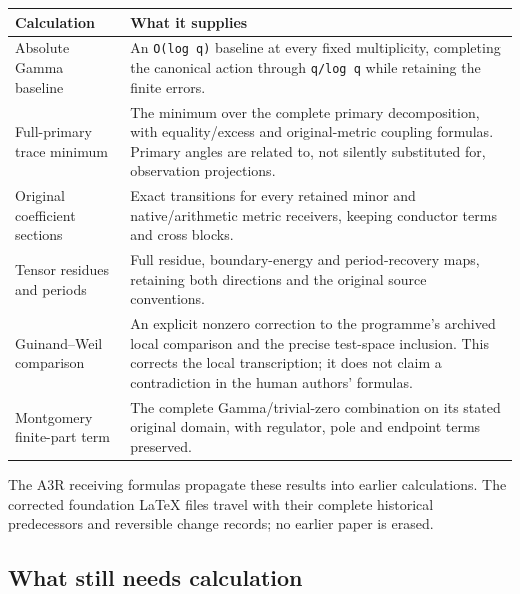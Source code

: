 \documentclass[
]{article}
\newcounter{none} %
\begin{document}
{\def\LTcaptype{none} %
\begin{longtable}[]{@{}
  >{\raggedright\arraybackslash}p{}
  >{\raggedright\arraybackslash}p{}@{}}
\toprule\noalign{}
\begin{minipage}[b]{\linewidth}\raggedright
Calculation
\end{minipage} & \begin{minipage}[b]{\linewidth}\raggedright
What it supplies
\end{minipage} \\
\midrule\noalign{}
\endhead
\bottomrule\noalign{}
\endlastfoot
Absolute Gamma baseline & An \texttt{O(log\ q)} baseline at every fixed
multiplicity, completing the canonical action through \texttt{q/log\ q}
while retaining the finite errors. \\
Full-primary trace minimum & The minimum over the complete primary
decomposition, with equality/excess and original-metric coupling
formulas. Primary angles are related to, not silently substituted for,
observation projections. \\
Original coefficient sections & Exact transitions for every retained
minor and native/arithmetic metric receivers, keeping conductor terms
and cross blocks. \\
Tensor residues and periods & Full residue, boundary-energy and
period-recovery maps, retaining both directions and the original source
conventions. \\
Guinand--Weil comparison & An explicit nonzero correction to the
programme's archived local comparison and the precise test-space
inclusion. This corrects the local transcription; it does not claim a
contradiction in the human authors' formulas. \\
Montgomery finite-part term & The complete Gamma/trivial-zero
combination on its stated original domain, with regulator, pole and
endpoint terms preserved. \\
\end{longtable}
}

The A3R receiving formulas propagate these results into earlier
calculations. The corrected foundation LaTeX files travel with their
complete historical predecessors and reversible change records; no
earlier paper is erased.

\subsection{What still needs
calculation}\label{what-still-needs-calculation}
\end{document}
